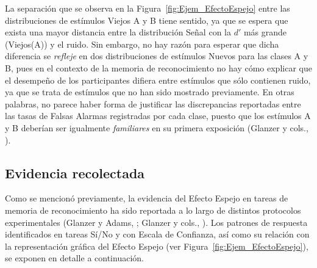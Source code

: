La separación que se observa en la Figura~\ref{fig:Ejem_EfectoEspejo} entre las distribuciones de estímulos Viejos A y B tiene sentido, ya que se espera que exista una mayor distancia entre la distribución Señal con la $d'$ más grande (Viejos(A)) y el ruido. Sin embargo, no hay razón para esperar que dicha diferencia se \textit{refleje} en dos distribuciones de estímulos Nuevos para las clases A y B, pues en el contexto de la memoria de reconocimiento no hay cómo explicar que el desempeño de los participantes difiera entre estímulos que sólo contienen ruido, ya que se trata de estímulos que no han sido mostrado previamente. En otras palabras, no parece haber forma de justificar las discrepancias reportadas entre las tasas de Falsas Alarmas registradas por cada clase, puesto que los estímulos A y B deberían ser igualmente \textit{familiares} en su primera exposición (Glanzer y cols., \citeyear{Glanzer1993}).\\

\subsection{Evidencia recolectada}

Como se mencionó previamente, la evidencia del Efecto Espejo en tareas de memoria de reconocimiento ha sido reportada a lo largo de distintos protocolos experimentales (Glanzer y Adams, \citeyear{Glanzer1990}; Glanzer y cols., \citeyear{Glanzer1993}). Los patrones de respuesta identificados en tareas Sí/No y con Escala de Confianza, así como su relación con la representación gráfica del Efecto Espejo (ver Figura~\ref{fig:Ejem_EfectoEspejo}), se exponen en detalle a continuación.\\

